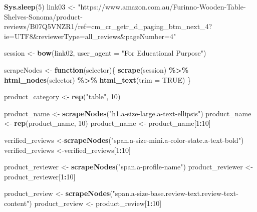 \documentclass[
]{article}
\newenvironment{Shaded}{\begin{snugshade}}{\end{snugshade}}
\newcommand{\AttributeTok}[1]{\textcolor[rgb]{0.13,0.29,0.53}{#1}}
\newcommand{\ConstantTok}[1]{\textcolor[rgb]{0.56,0.35,0.01}{#1}}
\newcommand{\ControlFlowTok}[1]{\textcolor[rgb]{0.13,0.29,0.53}{\textbf{#1}}}
\newcommand{\DecValTok}[1]{\textcolor[rgb]{0.00,0.00,0.81}{#1}}
\newcommand{\FunctionTok}[1]{\textcolor[rgb]{0.13,0.29,0.53}{\textbf{#1}}}
\newcommand{\NormalTok}[1]{#1}
\newcommand{\OtherTok}[1]{\textcolor[rgb]{0.56,0.35,0.01}{#1}}
\newcommand{\SpecialCharTok}[1]{\textcolor[rgb]{0.81,0.36,0.00}{\textbf{#1}}}
\newcommand{\StringTok}[1]{\textcolor[rgb]{0.31,0.60,0.02}{#1}}
\begin{document}
\begin{Shaded}
\begin{Highlighting}[]
   \FunctionTok{Sys.sleep}\NormalTok{(}\DecValTok{5}\NormalTok{)}
\NormalTok{link03 }\OtherTok{\textless{}{-}} \StringTok{"https://www.amazon.com.au/Furinno{-}Wooden{-}Table{-}Shelves{-}Sonoma/product{-}reviews/B07Q5VNZR1/ref=cm\_cr\_getr\_d\_paging\_btm\_next\_4?ie=UTF8\&reviewerType=all\_reviews\&pageNumber=4"}


\NormalTok{  session }\OtherTok{\textless{}{-}} \FunctionTok{bow}\NormalTok{(link02,}
               \AttributeTok{user\_agent =} \StringTok{"For Educational Purpose"}\NormalTok{)}

\NormalTok{  scrapeNodes }\OtherTok{\textless{}{-}} \ControlFlowTok{function}\NormalTok{(selector)\{}
    \FunctionTok{scrape}\NormalTok{(session) }\SpecialCharTok{\%\textgreater{}\%}
      \FunctionTok{html\_nodes}\NormalTok{(selector) }\SpecialCharTok{\%\textgreater{}\%}
      \FunctionTok{html\_text}\NormalTok{(}\AttributeTok{trim =} \ConstantTok{TRUE}\NormalTok{)}
\NormalTok{  \}}

\NormalTok{  product\_category }\OtherTok{\textless{}{-}} \FunctionTok{rep}\NormalTok{(}\StringTok{"table"}\NormalTok{, }\DecValTok{10}\NormalTok{)}

\NormalTok{  product\_name }\OtherTok{\textless{}{-}} \FunctionTok{scrapeNodes}\NormalTok{(}\StringTok{"h1.a{-}size{-}large.a{-}text{-}ellipsis"}\NormalTok{)}
\NormalTok{  product\_name }\OtherTok{\textless{}{-}} \FunctionTok{rep}\NormalTok{(product\_name, }\DecValTok{10}\NormalTok{)}
\NormalTok{  product\_name }\OtherTok{\textless{}{-}}\NormalTok{ product\_name[}\DecValTok{1}\SpecialCharTok{:}\DecValTok{10}\NormalTok{]}
  
\NormalTok{  verified\_reviews }\OtherTok{\textless{}{-}}\FunctionTok{scrapeNodes}\NormalTok{(}\StringTok{"span.a{-}size{-}mini.a{-}color{-}state.a{-}text{-}bold"}\NormalTok{)}
\NormalTok{  verified\_reviews }\OtherTok{\textless{}{-}}\NormalTok{verified\_reviews[}\DecValTok{1}\SpecialCharTok{:}\DecValTok{10}\NormalTok{]}
  
\NormalTok{  product\_reviewer }\OtherTok{\textless{}{-}} \FunctionTok{scrapeNodes}\NormalTok{(}\StringTok{"span.a{-}profile{-}name"}\NormalTok{)}
\NormalTok{  product\_reviewer }\OtherTok{\textless{}{-}}\NormalTok{ product\_reviewer[}\DecValTok{1}\SpecialCharTok{:}\DecValTok{10}\NormalTok{]}
  
\NormalTok{  product\_review }\OtherTok{\textless{}{-}} \FunctionTok{scrapeNodes}\NormalTok{(}\StringTok{"span.a{-}size{-}base.review{-}text.review{-}text{-}content"}\NormalTok{)}
\NormalTok{  product\_review }\OtherTok{\textless{}{-}}\NormalTok{ product\_review[}\DecValTok{1}\SpecialCharTok{:}\DecValTok{10}\NormalTok{]}
  

\end{Highlighting}
\end{Shaded}
\end{document}
